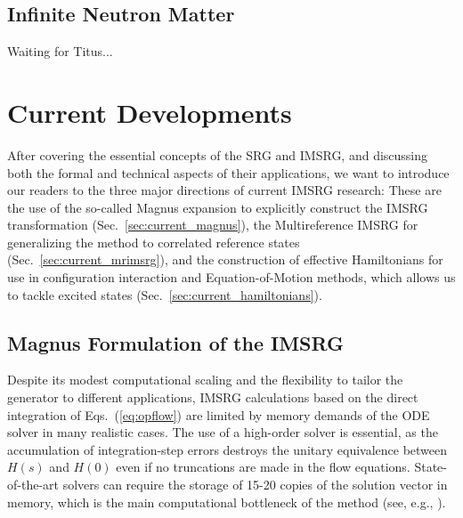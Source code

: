 \subsection{\label{sec:imsrg_neutron_matter}Infinite Neutron Matter}
Waiting for Titus...

\section{\label{sec:current}Current Developments}
After covering the essential concepts of the SRG and IMSRG, and discussing
both the formal and technical aspects of their applications, we want to
introduce our readers to the three major directions of current IMSRG
research: These are the use of the so-called Magnus expansion to explicitly 
construct the IMSRG transformation (Sec.~\ref{sec:current_magnus}), the
Multireference IMSRG for generalizing the method to correlated 
reference states (Sec.~\ref{sec:current_mrimsrg}), and the construction
of effective Hamiltonians for use in configuration interaction and 
Equation-of-Motion methods, which allows us to tackle excited states 
(Sec.~\ref{sec:current_hamiltonians}).

\subsection{\label{sec:current_magnus}Magnus Formulation of the IMSRG}

Despite its modest computational scaling and the flexibility to tailor 
the generator to different applications, IMSRG calculations based on 
the direct integration of Eqs.~(\ref{eq:opflow}) are limited by memory 
demands of the ODE solver in many realistic cases. The use of a
high-order solver is essential, as the accumulation of integration-step
errors destroys the unitary equivalence between $H(s)$ and $H(0)$ even
if no truncations are made in the flow equations. State-of-the-art
solvers can require the storage of 15-20 copies of the solution vector
in memory, which is the main computational bottleneck of the method
(see, e.g., \cite{Hindmarsh:1983pd,Brown:1989qd,Hindmarsh:2005kl}).

